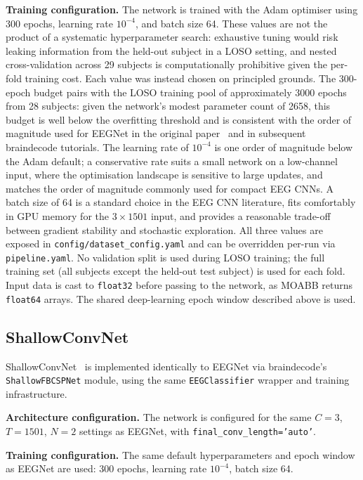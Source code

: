 \documentclass[english, bc, kiv, he, iso690alph, pdf]{fasthesis}
\begin{document}
\textbf{Training configuration.} The network is trained with the Adam optimiser using 300 epochs, learning rate $10^{-4}$, and batch size 64. These values are not the product of a systematic hyperparameter search: exhaustive tuning would risk leaking information from the held-out subject in a LOSO setting, and nested cross-validation across 29 subjects is computationally prohibitive given the per-fold training cost. Each value was instead chosen on principled grounds. The 300-epoch budget pairs with the LOSO training pool of approximately 3000 epochs from 28 subjects: given the network's modest parameter count of 2658, this budget is well below the overfitting threshold and is consistent with the order of magnitude used for EEGNet in the original paper~\cite{lawhern2018eegnet} and in subsequent braindecode tutorials. The learning rate of $10^{-4}$ is one order of magnitude below the Adam default; a conservative rate suits a small network on a low-channel input, where the optimisation landscape is sensitive to large updates, and matches the order of magnitude commonly used for compact EEG CNNs. A batch size of 64 is a standard choice in the EEG CNN literature, fits comfortably in GPU memory for the $3 \times 1501$ input, and provides a reasonable trade-off between gradient stability and stochastic exploration. All three values are exposed in \texttt{config/dataset\allowbreak\_\allowbreak config.yaml} and can be overridden per-run via \texttt{pipeline.yaml}. No validation split is used during LOSO training; the full training set (all subjects except the held-out test subject) is used for each fold. Input data is cast to \texttt{float32} before passing to the network, as MOABB returns \texttt{float64} arrays. The shared deep-learning epoch window described above is used.

\subsection{ShallowConvNet}

ShallowConvNet~\cite{schirrmeister2017deep} is implemented identically to EEGNet via braindecode's \texttt{ShallowFBCSPNet} module, using the same \texttt{EEGClassifier} wrapper and training infrastructure.

\textbf{Architecture configuration.} The network is configured for the same $C = 3$, $T = 1501$, $N = 2$ settings as EEGNet, with \texttt{final\_conv\_length='auto'}.

\textbf{Training configuration.} The same default hyperparameters and epoch window as EEGNet are used: 300 epochs, learning rate $10^{-4}$, batch size 64.
\end{document}
